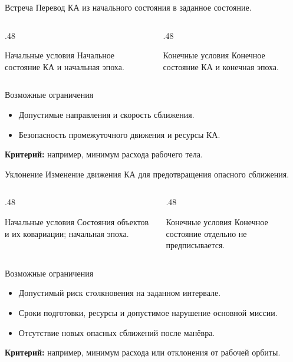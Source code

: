 \documentclass[11pt,aspectratio=169,t]{beamer}
\begin{document}
\begin{frame}{Встреча}
Перевод КА из начального состояния в заданное состояние.
\begin{columns}[T,onlytextwidth]
\begin{column}{.48\textwidth}
\begin{block}{Начальные условия}
\justifying
Начальное состояние КА и начальная эпоха.
\end{block}
\end{column}
\begin{column}{.48\textwidth}
\begin{block}{Конечные условия}
\justifying
Конечное состояние КА и конечная эпоха.
\end{block}
\end{column}
\end{columns}
\begin{block}{Возможные ограничения}
\begin{itemize}
\item Допустимые направления и скорость сближения.
\item Безопасность промежуточного движения и ресурсы КА.
\end{itemize}
\end{block}
\textbf{Критерий:} например, минимум расхода рабочего тела.
\end{frame}

\begin{frame}{Уклонение}
Изменение движения КА для предотвращения опасного сближения.
\begin{columns}[T,onlytextwidth]
\begin{column}{.48\textwidth}
\begin{block}{Начальные условия}
\justifying
Состояния объектов и их ковариации; начальная эпоха.
\end{block}
\end{column}
\begin{column}{.48\textwidth}
\begin{block}{Конечные условия}
\justifying
Конечное состояние отдельно не предписывается.
\end{block}
\end{column}
\end{columns}
\begin{block}{Возможные ограничения}
\begin{itemize}
\item Допустимый риск столкновения на заданном интервале.
\item Сроки подготовки, ресурсы и допустимое нарушение основной миссии.
\item Отсутствие новых опасных сближений после манёвра.
\end{itemize}
\end{block}
\textbf{Критерий:} например, минимум расхода или отклонения от рабочей орбиты.
\end{frame}
\end{document}
